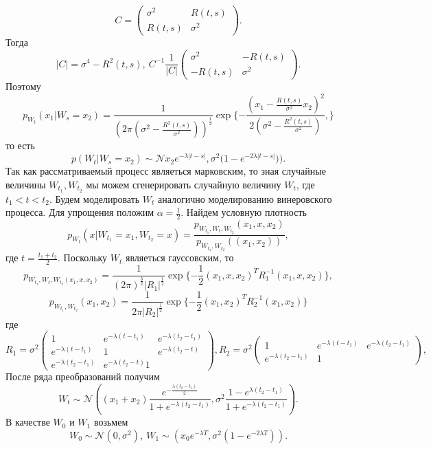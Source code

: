 \documentclass[11pt]{article}
\numberwithin{equation}{section}
\begin{document}
\begin{equation*}
  C=
  \begin{pmatrix}
  \sigma^2 & R(t,s)\\
  R(t,s) & \sigma^2
  \end{pmatrix}.
\end{equation*}
Тогда 
\begin{equation*}
  |C| = \sigma^4 - R^2(t,s), \ C^{-1} \frac{1}{|C|} 
  \begin{pmatrix}
  \sigma^2 & -R(t,s)\\
  -R(t,s) & \sigma^2
  \end{pmatrix}.
\end{equation*}
Поэтому 
$$ p_{W_t}(x_1|W_s = x_2) = \frac{1}{(2\pi (\sigma^2 - \frac{R^2(t,s)}{\sigma^2}) )^{\frac{1}{2}}} \exp \{ - \frac{(x_1-\frac{R(t,s)}{\sigma^2}x_2)^2}{2(\sigma^2 - \frac{R^2(t,s)}{\sigma^2})  },   \}$$
то есть 
$$ p(W_t|W_s=x_2) \sim \mathcal{N}{x_2 e^{-\lambda|t-s|}, \sigma^2 (1-e^{-2\lambda|t-s|}})).$$
Так как рассматриваемый процесс являеться марковским, то зная случайные величины $W_{t_1}, W_{t_2}$ мы можем сгенерировать 
случайную величину $W_t$, где $t_1 < t < t_2.$ Будем моделировать $W_t$ аналогично моделированию винеровского процесса.
Для упрощения положим $\alpha = \frac{1}{2}.$ Найдем условную плотность 
$$ p_{W_t} (x| W_{t_1} =x_1, W_{t_2} = x) = \frac{p_{W_{t_1},W_t, W_{t_2}}(x_1,x,x_2)}{p_{W_{t_1}, W_{t_2}}((x_1, x_2))},$$
где $t = \frac{t_1 + t_2}{2}$. Поскольку $W_t$ являеться гауссовским, то 
$$p_{W_{t_1}, W_t, W_{t_2}(x_1,x,x_2)} =  \frac{1}{(2\pi)^{\frac{3}{2}}|R_1|^{\frac{1}{2}}} \exp \{  -\frac{1}{2}(x_1,x,x_2)^T R_1^{-1}(x_1,x,x_2)  \},    $$
$$ p_{W_{t_1}, W_{t_2}}(x_1, x_2) = \frac{1}{2\pi |R_2|^{\frac{1}{2}}} \exp \{ -\frac{1}{2} (x_1, x_2)^T R_2^{-1}(x_1,x_2)\}$$
где 
\begin{equation*}
  R_1= \sigma^2
  \begin{pmatrix}
  1 & e^{-\lambda(t-t_1)} & e^{-\lambda(t_2-t_1)}\\
  e^{-\lambda(t-t_1)} & 1 & e^{-\lambda(t_2-t)}\\
  e^{-\lambda(t_2-t_1)} & e^{-\lambda(t_2-t)} 1 
  \end{pmatrix},
  R_2= \sigma^2
  \begin{pmatrix}
    1 & e^{-\lambda(t-t_1)} & e^{-\lambda(t_2-t_1)}\\
    e^{-\lambda(t_2-t_1)} & 1 
   \end{pmatrix},
\end{equation*}
После ряда преобразований получим 
$$ W_t \sim \mathcal{N} ((x_1+x_2) \frac{e^{-\frac{\lambda(t_2-t_1)}{2}}  }{1+e^{-\lambda(t_2-t_1)}}, \sigma^2 \frac{1-e^{\lambda(t_2-t_1)}}{1+e^{-\lambda(t_2-t_1)}} ).$$
В качестве $W_0$ и $W_1$ возьмем 
$$W_0 \sim \mathcal{N}(0,\sigma^2), \ W_1 \sim(x_0 e^{-\lambda T}, \sigma^2(1-e^{-2\lambda T}) ). $$
\end{document}
